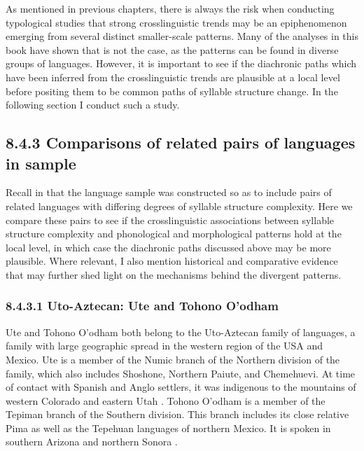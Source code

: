   As mentioned in previous chapters, there is always the risk when conducting typological studies that strong crosslinguistic trends may be an epiphenomenon emerging from several distinct smaller-scale patterns. Many of the analyses in this book have shown that is not the case, as the patterns can be found in diverse groups of languages. However, it is important to see if the diachronic paths which have been inferred from the crosslinguistic trends are plausible at a local level before positing them to be common paths of syllable structure change. In the following section I conduct such a study.


\subsection{8.4.3 Comparisons of related pairs of languages in sample}

  Recall in  that the language sample was constructed so as to include pairs of related languages with differing degrees of syllable structure complexity. Here we compare these pairs to see if the crosslinguistic associations between syllable structure complexity and phonological and morphological patterns hold at the local level, in which case the diachronic paths discussed above may be more plausible. Where relevant, I also mention historical and comparative evidence that may further shed light on the mechanisms behind the divergent patterns.


\subsubsection{\textbf{8.4.3.1} \textbf{Uto-Aztecan:} \textbf{Ute} \textbf{and} \textbf{Tohono} \textbf{O’odham}}

  Ute and Tohono O’odham both belong to the Uto-Aztecan family of languages, a family with large geographic spread in the western region of the USA and Mexico. Ute is a member of the Numic branch of the Northern division of the family, which also includes Shoshone, Northern Paiute, and Chemehuevi. At time of contact with Spanish and Anglo settlers, it was indigenous to the mountains of western Colorado and eastern Utah \citep{Givón2011}. Tohono O’odham is a member of the Tepiman branch of the Southern division. This branch includes its close relative Pima as well as the Tepehuan languages of northern Mexico. It is spoken in southern Arizona and northern Sonora \citep{Zepeda1983}.



